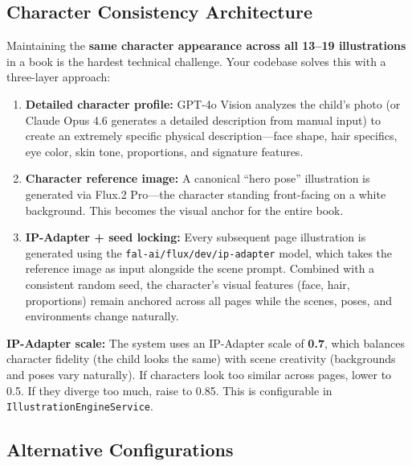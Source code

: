 \documentclass[12pt, letterpaper, oneside]{book}
\begin{document}
\subsection{Character Consistency Architecture}

Maintaining the \textbf{same character appearance across all 13--19 illustrations} in a book is the hardest technical challenge. Your codebase solves this with a three-layer approach:

\begin{enumerate}[leftmargin=2em]
  \item \textbf{Detailed character profile:} GPT-4o Vision analyzes the child's photo (or Claude Opus 4.6 generates a detailed description from manual input) to create an extremely specific physical description---face shape, hair specifics, eye color, skin tone, proportions, and signature features.

  \item \textbf{Character reference image:} A canonical ``hero pose'' illustration is generated via Flux.2 Pro---the character standing front-facing on a white background. This becomes the visual anchor for the entire book.

  \item \textbf{IP-Adapter + seed locking:} Every subsequent page illustration is generated using the \texttt{fal-ai/flux/dev/ip-adapter} model, which takes the reference image as input alongside the scene prompt. Combined with a consistent random seed, the character's visual features (face, hair, proportions) remain anchored across all pages while the scenes, poses, and environments change naturally.
\end{enumerate}

\begin{infobox}
\textbf{IP-Adapter scale:} The system uses an IP-Adapter scale of \textbf{0.7}, which balances character fidelity (the child looks the same) with scene creativity (backgrounds and poses vary naturally). If characters look too similar across pages, lower to 0.5. If they diverge too much, raise to 0.85. This is configurable in \texttt{IllustrationEngineService}.
\end{infobox}

\subsection{Alternative Configurations}
\end{document}
